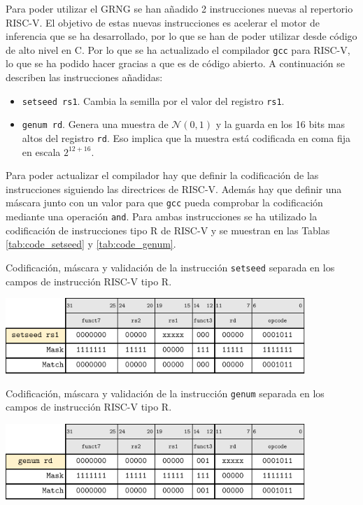 Para poder utilizar el GRNG se han añadido 2 instrucciones nuevas al repertorio RISC-V. El objetivo de estas nuevas instrucciones es acelerar el motor de inferencia que se ha desarrollado, por lo que se han de poder utilizar desde código de alto nivel en C. Por lo que se ha actualizado el compilador \texttt{gcc} para RISC-V, lo que se ha podido hacer gracias a que es de código abierto. A continuación se describen las instrucciones añadidas:
\begin{itemize}
    \item \texttt{setseed rs1}. Cambia la semilla por el valor del registro \texttt{rs1}.
    \item \texttt{genum rd}. Genera una muestra de $\mathcal{N}(0,1)$ y la guarda en los 16 bits mas altos del registro \texttt{rd}. Eso implica que la muestra está codificada en coma fija en escala $2^{12 + 16}$.
\end{itemize}

Para poder actualizar el compilador hay que definir la codificación de las instrucciones siguiendo las directrices de RISC-V. Además hay que definir una máscara junto con un valor para que \texttt{gcc} pueda comprobar la codificación mediante una operación \texttt{and}. Para ambas instrucciones se ha utilizado la codificación de instrucciones tipo R de RISC-V y se muestran en las Tablas \ref{tab:code_setseed} y \ref{tab:code_genum}.

\begin{table}[h]
    \centering
    \caption{Codificación, máscara y validación de la instrucción \texttt{setseed} separada en los campos de instrucción RISC-V tipo R.}
    \label{tab:code_setseed}
    \includegraphics[width=0.85\textwidth]{root/Imagenes/5_riscv/code_setseed.pdf}
\end{table}

\begin{table}[h]
    \centering
    \caption{Codificación, máscara y validación de la instrucción \texttt{genum} separada en los campos de instrucción RISC-V tipo R.}
    \label{tab:code_genum}
    \includegraphics[width=0.85\textwidth]{root/Imagenes/5_riscv/code_genum.pdf}
\end{table}

